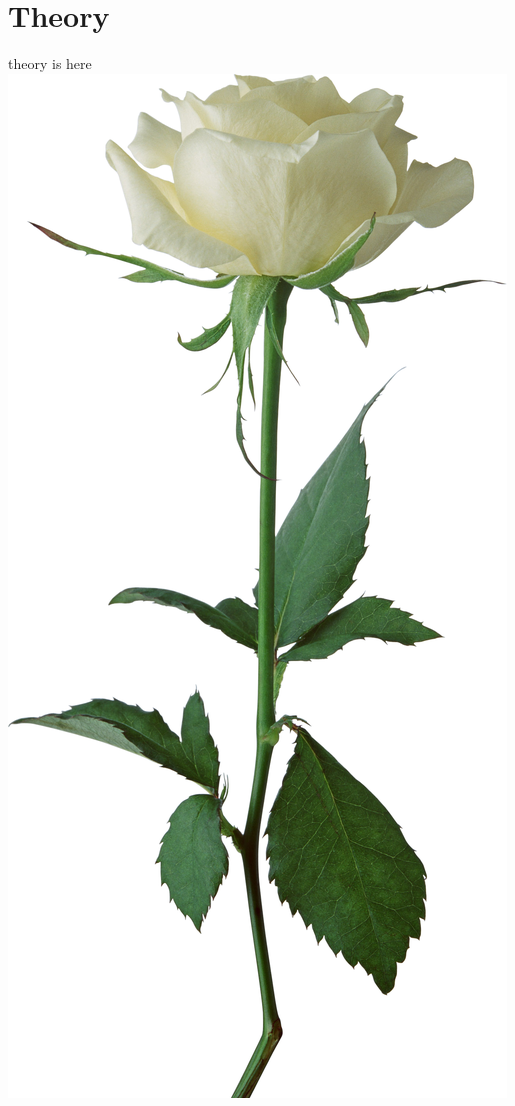 \documentclass[a4paper,7pt]{article}
\begin{document}
\section{Theory}
theory is here
\newline				%
\includegraphics[scale=0.35]{006.png}
\end{document}
